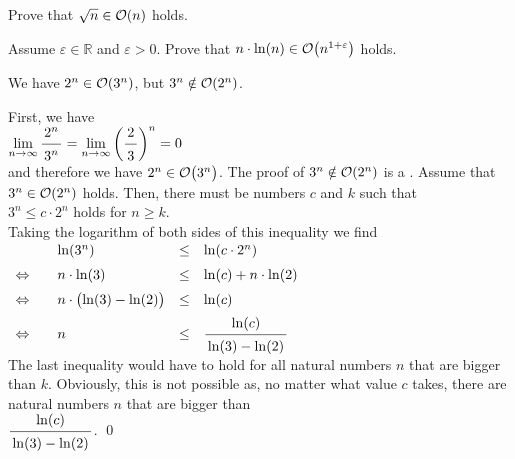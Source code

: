 \exercise
Prove that $\sqrt{n} \in \mathcal{O}(n)$ holds.  \eox

\exercise
Assume $\varepsilon \in \mathbb{R}$ and $\varepsilon > 0$.  Prove that $n \cdot \ln(n) \in \mathcal{O}\bigl(n^{1 + \varepsilon}\bigr)$
holds. \eox

\example
We have $2^n \in \mathcal{O}(3^n)$, but  $3^n \notin \mathcal{O}(2^n)$.
\eox

\proof
 First, we have \\[0.2cm]
\hspace*{1.3cm} 
$\displaystyle\lim\limits_{n \rightarrow \infty} \bruch{2^n}{3^n} = 
 \lim\limits_{n \rightarrow \infty} \left(\bruch{2}{3}\right)^n = 0$
\\[0.2cm]
and therefore we have $2^n \in \mathcal{O}\bigl(3^n\bigr)$.  The proof of $3^n \notin \mathcal{O}(2^n)$ is a 
.  Assume that 
$3^n \in \mathcal{O}(2^n)$ holds.  Then, there must be numbers $c$ and $k$ such that 
\\[0.2cm]
\hspace*{1.3cm}
$3^n \leq c \cdot 2^n$ \quad holds for $n \geq k$. 
\\[0.2cm]
Taking the logarithm of both sides of this inequality we find 
\\[0.2cm]
\hspace*{1.3cm}
$
\begin{array}{llcl}
                & \ln(3^n) & \leq & \ln(c \cdot 2^n) \\[0.2cm]
\Leftrightarrow\quad &  n \cdot \ln(3) & \leq & \ln(c) + n \cdot \ln(2) \\[0.2cm]
\Leftrightarrow &  n \cdot \bigl(\ln(3) - \ln(2)\bigr) & \leq & \ln(c)  \\[0.2cm]
\Leftrightarrow &  n  & \leq & \bruch{\ln(c)}{\ln(3) - \ln(2)}          \\[0.2cm]
\end{array}
$
\\[0.2cm]
The last inequality would have to hold for all natural numbers $n$ that are bigger than $k$.  Obviously,
this is not possible as, no matter what value $c$ takes, there are natural numbers $n$ that are bigger than 
\\[0.2cm]
\hspace*{1.3cm}
$\bruch{\ln(c)}{\ln(3) - \ln(2)}$.
\qed

